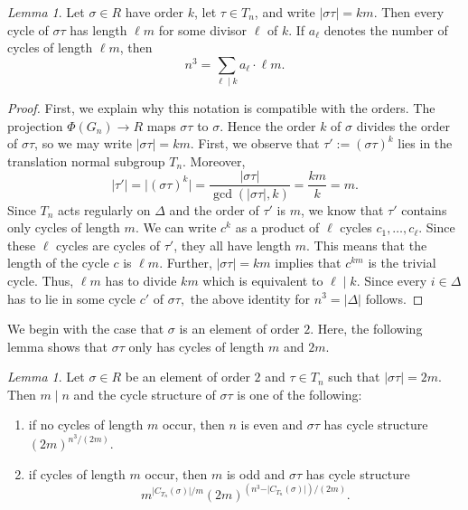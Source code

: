 \documentclass[12pt]{article}
\theoremstyle{definition}
\theoremstyle{remark}
\newtheorem{lemma}[theorem]{Lemma}
\begin{document}
\begin{lemma}\label{cycleslm}
Let $\sigma\in R$ have order $k$, let $\tau\in T_n$, and write $\vert\sigma\tau\vert=km$.
    Then every cycle of $\sigma\tau$ has length $\ell m$ for some divisor $\ell$ of $k$.
    If $a_\ell$ denotes the number of cycles of length $\ell m$, then
    \[
    n^3=\sum_{\ell\mid k} a_\ell \cdot \ell m.
    \]

\end{lemma}
\begin{proof}
First, we explain why this notation is compatible with the orders. The projection
$\Phi(G_n)\to R$ maps $\sigma\tau$ to $\sigma$. Hence the order $k$ of $\sigma$
divides the order of $\sigma\tau$, so we may write $\vert\sigma\tau\vert=km$.
First, we observe that $\tau':=(\sigma\tau)^k$ lies in the translation normal subgroup $T_n$. Moreover,
\[
\vert \tau'\vert=\vert(\sigma\tau)^k\vert
=\frac{\vert\sigma\tau\vert}{\gcd(\vert\sigma\tau\vert,k)}
=\frac{km}{k}=m.
\]
Since $T_n$ acts regularly on $\Delta$ and the order of $\tau'$ is $m$, we know that
$\tau'$ contains only cycles of length $m.$ We can write $c^k$ as a product of $\ell$ cycles $c_1,\ldots,c_{\ell}.$ Since these $\ell$ cycles are cycles of $\tau'$, they all have length $m.$ This means that the length of the cycle $c$ is $\ell m.$ Further, $\vert \sigma\tau\vert=km$ implies that $c^{km}$ is the trivial cycle. Thus, $\ell m$ has to divide $km$ which is equivalent to $\ell \mid k.$ Since every $i\in \Delta$ has to lie in some cycle $c'$ of $\sigma\tau,$ the above identity for $n^3 =\vert \Delta\vert $ follows.
\end{proof}

We begin with the case that $\sigma$ is an element of order $2.$ Here, the following lemma shows that $\sigma\tau$ only has cycles of length $m$ and $2m$.


\begin{lemma}\label{lem:cyclestruct2b}
Let $\sigma\in R$ be an element of order $2$ and $\tau \in T_n$ such that $\vert \sigma\tau\vert =2m.$
Then $m\mid n$ and the cycle structure of $\sigma\tau$ is one of the following:
    
\begin{enumerate}
\item[(a)] if no cycles of length $m$ occur, then $n$ is even and
$\sigma\tau $ has cycle structure $(2m)^{n^3/(2m)}$.
\item[(b)]  if cycles of length $m$ occur, then $m$ is odd and $\sigma \tau$ has cycle structure  $$m^{\vert C_{T_n}(\sigma)\vert /m}(2m)^{(n^3-\vert C_{T_n}(\sigma)\vert )/(2m)}.$$

\end{enumerate}
\end{lemma}
\end{document}
